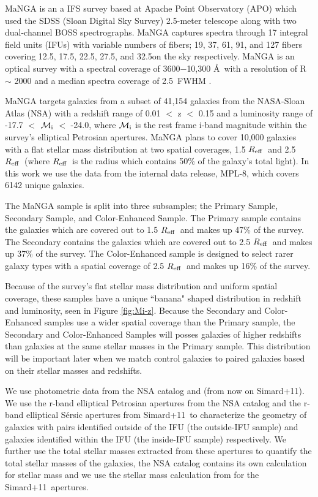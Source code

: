 \documentclass[iop,revtex4,twocolumn,apj,numberedappendix,appendixfloats]{emulateapj}
\newcommand{\reff}{$R_{\rm eff}$}
\newcommand{\simard}{Simard+11}
\begin{document}
MaNGA is an a IFS survey based at Apache Point Observatory (APO) which used the SDSS (Sloan Digital Sky Survey) 2.5-meter telescope along with two dual-channel BOSS spectrographs. MaNGA captures spectra through 17 integral field units (IFUs) with variable numbers of fibers; 19, 37, 61, 91, and 127 fibers covering 12.5\arcsec, 17.5\arcsec, 22.5\arcsec, 27.5\arcsec, and 32.5\arcsec on the sky respectively. MaNGA is an optical survey with a spectral coverage of 3600$-$10,300 \AA\ with a resolution of R $\sim$ 2000 and a median spectra coverage of 2.5\arcsec\ FWHM \citep{Bundy:2015}. 

MaNGA targets galaxies from a subset of 41,154 galaxies from the NASA-Sloan Atlas (NSA) with a redshift range of 0.01 $<$ z $<$ 0.15 and a luminosity range of -17.7 $<$ $\mathcal{M_{\rm i}}$ $<$ -24.0, where $\mathcal{M_{\rm i}}$ is the rest frame i-band magnitude within the survey's elliptical Petrosian apertures. MaNGA plans to cover 10,000 galaxies with a flat stellar mass distribution at two spatial coverages, 1.5 \reff\ and 2.5 \reff\ (where \reff\ is the radius which contains 50\% of the galaxy's total light). In this work we use the data from the internal data release, MPL-8, which covers 6142 unique galaxies. 

The MaNGA sample is split into three subsamples; the Primary Sample, Secondary Sample, and Color-Enhanced Sample. The Primary sample contains the galaxies which are covered out to 1.5 \reff\ and makes up 47\% of the survey. The Secondary contains the galaxies which are covered out to 2.5 \reff\ and makes up 37\% of the survey. The Color-Enhanced sample is designed to select rarer galaxy types with a spatial coverage of 2.5 \reff\ and makes up 16\% of the survey. 

Because of the survey's flat stellar mass distribution and uniform spatial coverage, these samples have a unique ``banana" shaped distribution in redshift and luminosity, seen in Figure \ref{fig:Mi-z}. Because the Secondary and Color-Enhanced samples use a wider spatial coverage than the Primary sample, the Secondary and Color-Enhanced Samples will posses galaxies of higher redshifts than galaxies at the same stellar masses in the Primary sample. This distribution will be important later when we match control galaxies to paired galaxies based on their stellar masses and redshifts.

We use photometric data from the NSA catalog and \citet{Simard:2011} (from now on \simard). We use the r-band elliptical Petrosian apertures from the NSA catalog and the r-band elliptical S\'ersic apertures from \simard\ to characterize the geometry of galaxies with pairs identified outside of the IFU (the outside-IFU sample) and galaxies identified within the IFU (the inside-IFU sample) respectively. We further use the total stellar masses extracted from these apertures to quantify the total stellar masses of the galaxies, the NSA catalog contains its own calculation for stellar mass and we use the stellar mass calculation from \citet{Mendel:2014} for the \simard\ apertures. 
\end{document}
